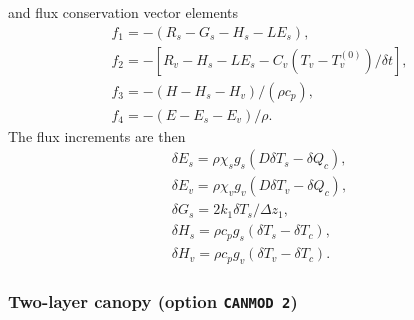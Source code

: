 \documentclass[fleqn]{article}
\begin{document}
and flux conservation vector elements
\begin{gather}
f_1 = -(R_s - G_s - H_s - LE_s), \nonumber \\
f_2 = -[R_v - H_s - LE_s - C_v(T_v - T_v^{(0)})/\delta t], \nonumber \\
f_3 = -(H - H_s - H_v)/(\rho c_p), \nonumber \\
f_4 = -(E - E_s - E_v)/\rho.
\end{gather}
The flux increments are then
\begin{gather}
\delta E_s = \rho \chi_s g_s(D\delta T_s - \delta Q_c), \nonumber \\
\delta E_v = \rho \chi_v g_v(D\delta T_v - \delta Q_c), \nonumber \\
\delta G_s = 2 k_1\delta T_s / \Delta z_1, \nonumber \\
\delta H_s = \rho c_p g_s(\delta T_s - \delta T_c), \nonumber \\
\delta H_v = \rho c_p g_v(\delta T_v - \delta T_c).
\end{gather}

\subsubsection{Two-layer canopy (option {\tt CANMOD 2})}
\end{document}
